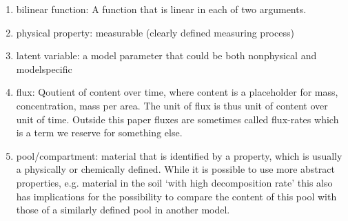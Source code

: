 \begin{enumerate}
\begin{enumerate}
    \begin{enumerate}
    \item
      \label{glossary:bilinear} 
      bilinear function: A function that is linear in each of two arguments.
    \item
      \label{glossary:physProp} 
      physical property: measurable (clearly defined measuring process)
    \item
      \label{glossary:latentVar} 
      latent variable: a model parameter that could be both nonphysical and modelspecific 
    \item
    \label{glossary:flux}
    flux: Qoutient of content over time, where content is a placeholder for mass, concentration, mass per area.
    The unit of flux is thus unit of content over unit of time.
    Outside this paper fluxes are sometimes called flux-rates     which is a term we reserve for something else.
    \item
    \label{glossary:pool}
    pool/compartment: material that is identified by a property, which is usually a physically or chemically defined. While it is possible to use more abstract properties, e.g. material in the soil `with high decomposition rate' this also has implications for the possibility to compare the content of this pool with those of a similarly defined pool in another model.
    

\end{enumerate}
\end{enumerate}
\end{enumerate}
